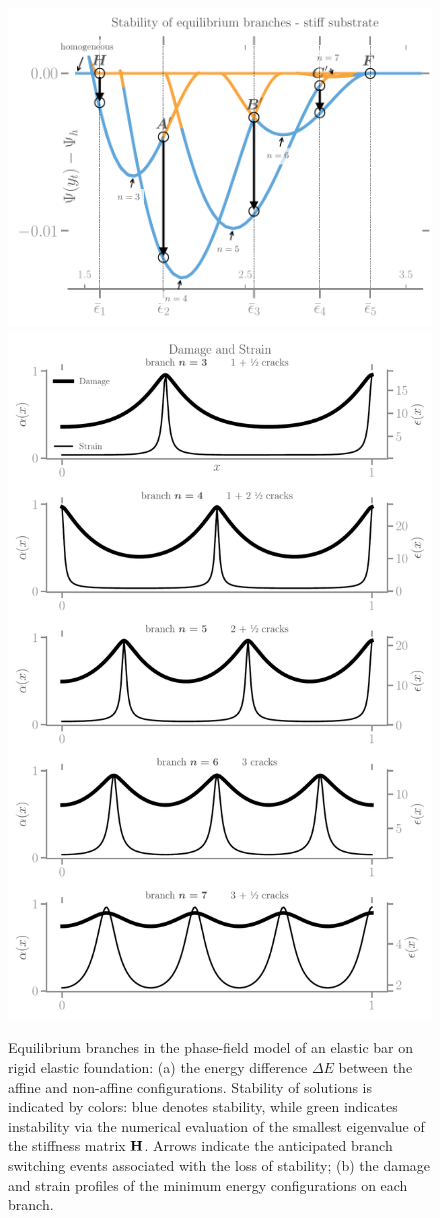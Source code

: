 \begin{figure}
\includegraphics[width=.8\textwidth]{../images/model_stiff_energy.pdf}
\includegraphics[width=.7\textwidth]{../images/model_stiff_fields.pdf}
    \caption{
Equilibrium branches in the phase-field model of an elastic bar on rigid elastic foundation: (a) the energy difference $\Delta E$ between the affine and non-affine configurations. Stability of solutions is indicated by colors: blue denotes stability, while green indicates instability   via the numerical evaluation of the smallest eigenvalue of the stiffness matrix $\mathbf{H}$. Arrows indicate the anticipated branch switching events associated with the loss of stability; (b) the damage and strain profiles of the minimum energy configurations on each branch.}
    \label{fig:branches-stiff}
\end{figure}
